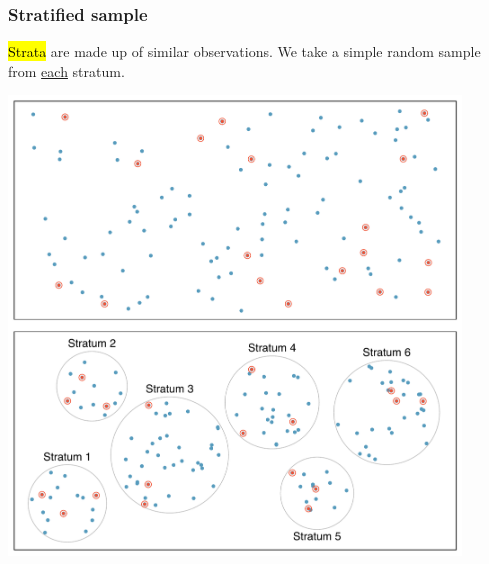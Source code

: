 
\begin{frame}
\frametitle{Stratified sample}

\hl{Strata} are made up of similar observations. We take a simple random sample from \underline{each} stratum.

\begin{center}
\includegraphics[width=0.9\textwidth]{1-4_obs_studies_sampling/figures/sampling_methods/stratified}
\end{center}

\end{frame}


